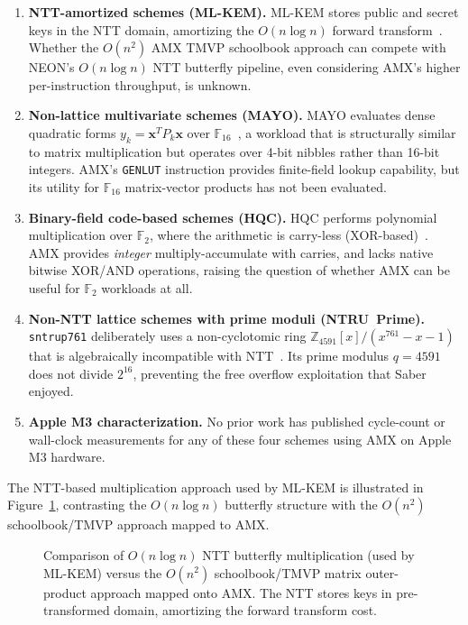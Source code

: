 \documentclass[utf8]{FrontiersinHarvard}
\newcommand{\boxedfigure}[1]{%
  \fcolorbox{BorderGray}{LightBg}{%
    \begin{minipage}{0.94\linewidth}
      \centering
      #1
    \end{minipage}}}
\begin{document}
\begin{enumerate}
  \item \textbf{NTT-amortized schemes (ML-KEM).} ML-KEM stores public and secret keys in the NTT domain, amortizing the $O(n \log n)$ forward transform~\cite{longa2016speeding}. Whether the $O(n^2)$ AMX TMVP schoolbook approach can compete with NEON's $O(n \log n)$ NTT butterfly pipeline, even considering AMX's higher per-instruction throughput, is unknown.
  
  \item \textbf{Non-lattice multivariate schemes (MAYO).} MAYO evaluates dense quadratic forms $y_k = \mathbf{x}^T P_k \mathbf{x}$ over $\mathbb{F}_{16}$~\cite{beullens2022mayo}, a workload that is structurally similar to matrix multiplication but operates over 4-bit nibbles rather than 16-bit integers. AMX's \texttt{GENLUT} instruction provides finite-field lookup capability, but its utility for $\mathbb{F}_{16}$ matrix-vector products has not been evaluated.
  
  \item \textbf{Binary-field code-based schemes (HQC).} HQC performs polynomial multiplication over $\mathbb{F}_2$, where the arithmetic is carry-less (XOR-based)~\cite{hqc2025spec}. AMX provides \emph{integer} multiply-accumulate with carries, and lacks native bitwise XOR/AND operations, raising the question of whether AMX can be useful for $\mathbb{F}_2$ workloads at all.
  
  \item \textbf{Non-NTT lattice schemes with prime moduli (NTRU~Prime).} \texttt{sntrup761} deliberately uses a non-cyclotomic ring $\mathbb{Z}_{4591}[x]/(x^{761}-x-1)$ that is algebraically incompatible with NTT~\cite{ntruprime2017spec}. Its prime modulus $q = 4591$ does not divide $2^{16}$, preventing the free overflow exploitation that Saber enjoyed.
  
  \item \textbf{Apple M3 characterization.} No prior work has published cycle-count or wall-clock measurements for any of these four schemes using AMX on Apple M3 hardware.
\end{enumerate}

The NTT-based multiplication approach used by ML-KEM is illustrated in Figure~\ref{fig:ntt-butterfly}, contrasting the $O(n \log n)$ butterfly structure with the $O(n^2)$ schoolbook/TMVP approach mapped to AMX.

\begin{figure}[htbp]
  \centering
  \boxedfigure{}
  \caption{Comparison of $O(n\log n)$ NTT butterfly multiplication (used by ML-KEM) versus the $O(n^2)$ schoolbook/TMVP matrix outer-product approach mapped onto AMX. The NTT stores keys in pre-transformed domain, amortizing the forward transform cost.}
  \label{fig:ntt-butterfly}
\end{figure}
\end{document}
